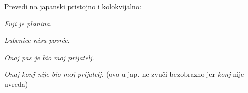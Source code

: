 	\begin{mondai}{\ten Prevedi na japanski pristojno i kolokvijalno:}
		\item \textit{Fuji je planina}.
		\item \textit{Lubenice nisu povrće}.
		\item \textit{Onaj pas je bio moj prijatelj}.
		\item \textit{Onaj konj nije bio moj prijatelj}. (ovo u jap. ne zvuči bezobrazno jer \textit{konj} nije uvreda)
	\end{mondai}
	

